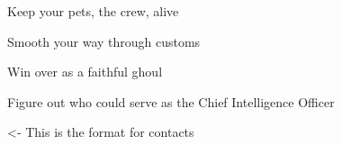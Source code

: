 \documentclass[char]{guildcamp4}
\begin{document}
 

\begin{itemz}[Goals]
	\item Keep your pets, the crew, alive
	\item Smooth your way through customs
	\item Win over \cSpite{} as a faithful ghoul
	\item Figure out who could serve as the Chief Intelligence Officer

\end{itemz}

\begin{itemz}[Notes]
	\item 
\end{itemz}

\begin{contacts}
	\contact{\cVtwo{}} <- This is the format for contacts 
	\contact{\cVthree{}}
	\contact{\cJoan{}}
	\contact{\cJulie{}}
	\contact{\cJames{}}
	\contact{\cRasputin{}}
	\contact{\cSpite{}}
	\contact{\cPlead{}}
\end{contacts}
\end{document}
